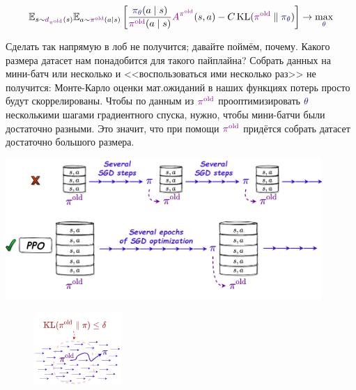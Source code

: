 \begin{equation}\label{lowerboundunconstrained}
\E_{s \sim \textcolor{ChadPurple}{d_{\pi^{\old}}}(s)} \E_{a \sim \textcolor{ChadPurple}{\pi^{\old}}(a \mid s)} \left[ \frac{\textcolor{ChadBlue}{\pi_\theta}(a \mid s)}{\textcolor{ChadPurple}{\pi^{\old}}(a \mid s)} \textcolor{ChadPurple}{A^{\pi^{\old}}}(s, a) - C \KL(\textcolor{ChadPurple}{\pi^{\old}} \parallel \textcolor{ChadBlue}{\pi_\theta}) \right] \to \max_{\textcolor{ChadBlue}{\theta}}
\end{equation}

Сделать так напрямую в лоб не получится; давайте поймём, почему. Какого размера датасет нам понадобится для такого пайплайна? Собрать данных на мини-батч или несколько и <<воспользоваться ими несколько раз>> не получится: Монте-Карло оценки мат.ожиданий в наших функциях потерь просто будут скоррелированы. Чтобы по данным из $\textcolor{ChadPurple}{\pi^{\old}}$ прооптимизировать $\textcolor{ChadBlue}{\theta}$ несколькими шагами градиентного спуска, нужно, чтобы мини-батчи были достаточно разными. Это значит, что при помощи $\textcolor{ChadPurple}{\pi^{\old}}$ придётся собрать датасет достаточно большого размера.

\vspace{0.4cm}
\begin{center}
\includegraphics[width=0.9\textwidth]{Images/PPOpipeline2.png}
\end{center}

\begin{figure}
\vspace{-0.5cm}
\centering
\includegraphics[width=0.3\textwidth]{Images/TrustRegion1.png}
\vspace{-0.5cm}
\end{figure}

